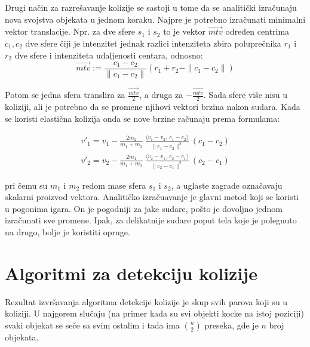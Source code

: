 \documentclass[12pt,oneside]{memoir}
\begin{document}
Drugi način za razrešavanje kolizije se sastoji u tome da se analitički izračunaju nova svojstva objekata u jednom koraku.
Najpre je potrebno izračunati minimalni vektor translacije. Npr. za dve sfere $s_1$ i $s_2$ to je vektor $\vec{mtv}$
određen centrima $c_1, c_2$ dve sfere čiji je intenzitet jednak razlici intenziteta zbira poluprečnika
$r_1$ i $r_2$ dve sfere i intenziteta udaljenosti centara, odnosno:
\begin{equation}
	\label{eq:mtv}
	 \vec{mtv} := \frac{{c_1 - c_2}} {\|{c_1 - c_2}\|} 
	(r_1 + r_2 - \| {c_1 - c_2} \| ) 
\end{equation}

Potom se jedna sfera translira za $ \frac{ \vec{mtv} }{ 2 }$, a druga za $ -\frac{ \vec{mtv} }{ 2 }$.
Sada sfere više nisu u koliziji, ali je potrebno da se promene njihovi vektori brzina nakon sudara.
Kada se koristi elastična kolizija onda se nove brzine računaju prema formulama:


\begin{equation}
	\label{eq:razresenje}
	\begin{split}
		{v}'_1= {v}_1-\frac{2 m_2}{m_1+m_2} \ \frac{\langle  {v}_1- {v}_2,\, {c}_1- {c}_2\rangle}{\| {c}_1- {c}_2\|^2} \ ( {c}_1- {c}_2) \\
		{v}'_2= {v}_2-\frac{2 m_1}{m_1+m_2} \ \frac{\langle  {v}_2- {v}_1,\, {c}_2- {c}_1\rangle}{\| {c}_2- {c}_1\|^2} \ ( {c}_2- {c}_1) 
	\end{split}
\end{equation}


pri čemu su $m_1$ i $m_2$ redom mase sfera $s_1$ i $s_2$, a uglaste zagrade označavaju skalarni proizvod vektora.
Analitičko izračuavanje je glavni metod koji se koristi u pogonima igara.
On je pogodniji za jake sudare, pošto je dovoljno jednom izračunati sve promene.
Ipak, za delikatnije sudare poput tela koje je polegnuto na drugo, bolje je koristiti opruge.

\chapter{Algoritmi za detekciju kolizije}
\label{sec:algoritmi}

Rezultat izvršavanja algoritma detekcije kolizije je skup svih parova koji su u koliziji.
U najgorem slučaju (na primer kada su svi objekti kocke na istoj poziciji) svaki objekat se seče sa svim ostalim
 i tada ima $ {n\choose 2}  $ preseka, gde je $n$ broj objekata. 
\end{document}
